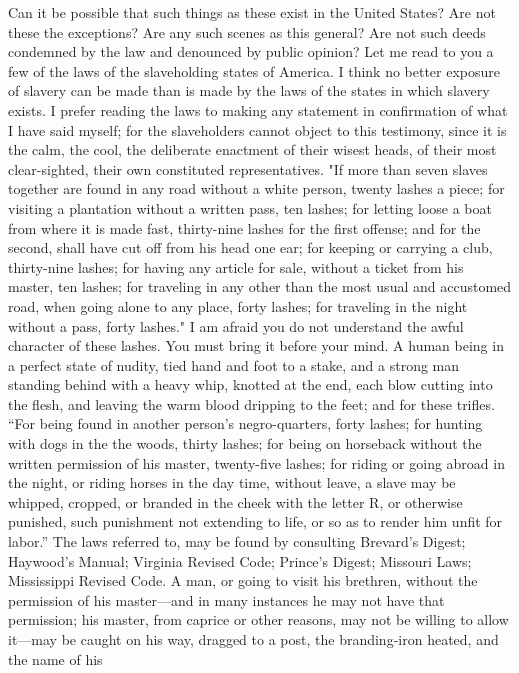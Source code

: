 Can it be possible that such things as these exist in the United States?
Are not these the exceptions? Are any such scenes as this general? Are
not such deeds condemned by the law and denounced by public opinion? Let
me read to you a few of the laws of the slaveholding states of America.
I think no better exposure of slavery can be made than is made by the
laws of the states in which slavery exists. I prefer reading the laws to
making any statement in confirmation of what I have said myself; for the
slaveholders cannot object to this testimony, since it is the calm, the
cool, the deliberate enactment of their wisest heads, of their most
clear-sighted, their own constituted representatives. "If more than
seven slaves together are found in any road without a white person,
twenty lashes a piece; for visiting a plantation without a written pass,
ten lashes; for letting loose a boat from where it is made
{\protect\hypertarget{414}{}{}}fast, thirty-nine lashes for the first
offense; and for the second, shall have cut off from his head one ear;
for keeping or carrying a club, thirty-nine lashes; for having any
article for sale, without a ticket from his master, ten lashes; for
traveling in any other than the most usual and accustomed road, when
going alone to any place, forty lashes; for traveling in the night
without a pass, forty lashes." I am afraid you do not understand the
awful character of these lashes. You must bring it before your mind. A
human being in a perfect state of nudity, tied hand and foot to a stake,
and a strong man standing behind with a heavy whip, knotted at the end,
each blow cutting into the flesh, and leaving the warm blood dripping to
the feet; and for these trifles. ``For being found in another person's
negro-quarters, forty lashes; for hunting with dogs in the the woods,
thirty lashes; for being on horseback without the written permission of
his master, twenty-five lashes; for riding or going abroad in the night,
or riding horses in the day time, without leave, a slave may be whipped,
cropped, or branded in the cheek with the letter R, or otherwise
punished, such punishment not extending to life, or so as to render him
unfit for labor.'' The laws referred to, may be found by consulting
Brevard's Digest; Haywood's Manual; Virginia Revised Code; Prince's
Digest; Missouri Laws; Mississippi Revised Code. A man, or going to
visit his brethren, without the permission of his master---and in many
instances he may not have that permission; his master, from caprice or
other reasons, may not be willing to allow it---may be caught on his
way, dragged to a post, the branding-iron heated, and the name of his
